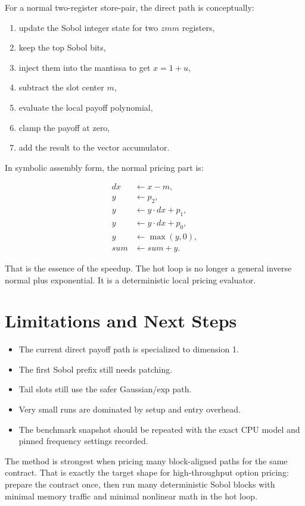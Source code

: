 \documentclass[11pt,a4paper]{article}
\begin{document}
For a normal two-register store-pair, the direct path is conceptually:

\begin{enumerate}
  \item update the Sobol integer state for two \(zmm\) registers,
  \item keep the top Sobol bits,
  \item inject them into the mantissa to get \(x=1+u\),
  \item subtract the slot center \(m\),
  \item evaluate the local payoff polynomial,
  \item clamp the payoff at zero,
  \item add the result to the vector accumulator.
\end{enumerate}

In symbolic assembly form, the normal pricing part is:

\[
\begin{aligned}
  dx &\leftarrow x - m,\\
  y  &\leftarrow p_2,\\
  y  &\leftarrow y\cdot dx + p_1,\\
  y  &\leftarrow y\cdot dx + p_0,\\
  y  &\leftarrow \max(y,0),\\
  sum &\leftarrow sum + y.
\end{aligned}
\]

That is the essence of the speedup. The hot loop is no longer a general inverse
normal plus exponential. It is a deterministic local pricing evaluator.

\section{Limitations and Next Steps}

\begin{itemize}
  \item The current direct payoff path is specialized to dimension 1.
  \item The first Sobol prefix still needs patching.
  \item Tail slots still use the safer Gaussian/exp path.
  \item Very small runs are dominated by setup and entry overhead.
  \item The benchmark snapshot should be repeated with the exact CPU model and
        pinned frequency settings recorded.
\end{itemize}

The method is strongest when pricing many block-aligned paths for the same
contract. That is exactly the target shape for high-throughput option pricing:
prepare the contract once, then run many deterministic Sobol blocks with minimal
memory traffic and minimal nonlinear math in the hot loop.
\end{document}
